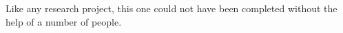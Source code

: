 \begin{acknowledgments}

  Like any research project, this one could not have been completed without the
  help of a number of people. 











\end{acknowledgments}
